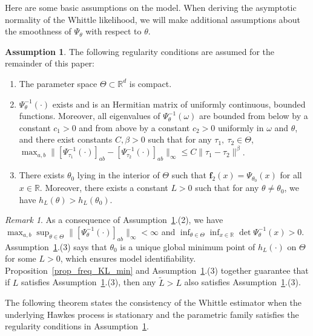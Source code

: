 \documentclass[11pt]{article}
\numberwithin{equation}{section}
\theoremstyle{plain}
\theoremstyle{definition}
\theoremstyle{definition}
\theoremstyle{assumption}
\newtheorem{assumption}{Assumption}
\theoremstyle{proposition}
\theoremstyle{proposition}
\theoremstyle{example}
\theoremstyle{lemma}
\theoremstyle{theorem}
\theoremstyle{remark}
\newtheorem*{remark}{Remark}
\begin{document}
Here are some basic assumptions on the model. When deriving the asymptotic normality of the Whittle likelihood, we will make additional assumptions about the smoothness of $\Psi_{\theta}$ with respect to $\theta$.
\begin{assumption}\label{assumption_model} The following regularity conditions are assumed for the remainder of this paper:
\begin{enumerate}[(1)]
\item The parameter space $\Theta\subset\mathbb{R}^d$ is compact.
\item $\Psi_{\theta}^{-1}(\cdot)$ exists and is an Hermitian matrix of uniformly continuous, bounded functions. Moreover, all eigenvalues of $\Psi_{\theta}^{-1}(\omega)$ are bounded from below by a constant $c_1>0$ and from above by a constant $c_2>0$ uniformly in $\omega$ and $\theta$, and there exist constants $C,\beta>0$ such that for any $\tau_1,~\tau_2\in\Theta$, $\max_{a,b}\|[\Psi_{\tau_1}^{-1}(\cdot)]_{ab} - [\Psi_{\tau_2}^{-1}(\cdot)]_{ab}\|_{\infty} \leqslant C\|\tau_1 - \tau_2\|^{\beta}$.
\item There exists $\theta_0$ lying in the interior of $\Theta$ such that $\boldsymbol{f}_2(x) = \Psi_{\theta_0}(x)$ for all $x\in\mathbb{R}$. Moreover, there exists a constant $L>0$ such that for any $\theta\neq\theta_0$, we have $h_L(\theta)> h_L(\theta_0)$.
\end{enumerate}

\end{assumption}
\begin{remark}
As a consequence of Assumption~\ref{assumption_model}.(2), we have $\max_{a,b}\sup_{\theta\in\Theta}\|[\Psi_{\theta}^{-1}(\cdot)]_{ab}\|_{\infty}< \infty$ and $\inf_{\theta\in\Theta}\inf_{x\in\mathbb{R}}\det\Psi_{\theta}^{-1}(x)>0$. Assumption~\ref{assumption_model}.(3) says that $\theta_0$ is a unique global minimum point of $h_L(\cdot)$ on $\Theta$ for some $L>0$, which ensures model identifiability. Proposition~\ref{prop_freq_KL_min} and Assumption~\ref{assumption_model}.(3) together guarantee that if $L$ satisfies Assumption~\ref{assumption_model}.(3), then any $\tilde{L}>L$ also satisfies Assumption~\ref{assumption_model}.(3).
\end{remark}
The following theorem states the consistency of the Whittle estimator when the underlying Hawkes process is stationary and the parametric family satisfies the regularity conditions in Assumption~\ref{assumption_model}.
\end{document}
